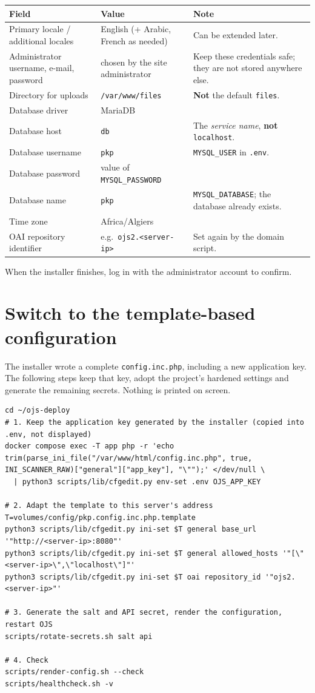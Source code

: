 \documentclass[11pt,a4paper]{report}
\newcommand{\code}[1]{\texttt{\small #1}}
\newcommand{\file}[1]{\texttt{\small #1}}
\begin{document}
\begin{tabularx}{\linewidth}{@{}P{4.8cm}P{4.2cm}L@{}}
\toprule
\textbf{Field} & \textbf{Value} & \textbf{Note} \\
\midrule
Primary locale / additional locales & English (+ Arabic, French as needed) & Can be extended later. \\
Administrator username, e-mail, password & chosen by the site administrator & Keep these credentials safe; they are not stored anywhere else. \\
Directory for uploads   & \code{/var/www/files}  & \textbf{Not} the default \code{files}. \\
Database driver         & MariaDB                & \\
Database host           & \code{db}              & The \emph{service name}, \textbf{not} \code{localhost}. \\
Database username       & \code{pkp}             & \code{MYSQL\_USER} in \file{.env}. \\
Database password       & value of \code{MYSQL\_PASSWORD} & \\
Database name           & \code{pkp}             & \code{MYSQL\_DATABASE}; the database already exists. \\
Time zone               & Africa/Algiers         & \\
OAI repository identifier & e.g.\ \code{ojs2.<server-ip>} & Set again by the domain script. \\
\bottomrule
\end{tabularx}

When the installer finishes, log in with the administrator account to confirm.

\section{Switch to the template-based configuration}\label{sec:aftersetup}
The installer wrote a complete \file{config.inc.php}, including a new application key. The
following steps keep that key, adopt the project's hardened settings and generate the
remaining secrets. Nothing is printed on screen.

\begin{lstlisting}
cd ~/ojs-deploy
# 1. Keep the application key generated by the installer (copied into .env, not displayed)
docker compose exec -T app php -r 'echo trim(parse_ini_file("/var/www/html/config.inc.php", true, INI_SCANNER_RAW)["general"]["app_key"], "\"");' </dev/null \
  | python3 scripts/lib/cfgedit.py env-set .env OJS_APP_KEY

# 2. Adapt the template to this server's address
T=volumes/config/pkp.config.inc.php.template
python3 scripts/lib/cfgedit.py ini-set $T general base_url '"http://<server-ip>:8080"'
python3 scripts/lib/cfgedit.py ini-set $T general allowed_hosts '"[\"<server-ip>\",\"localhost\"]"'
python3 scripts/lib/cfgedit.py ini-set $T oai repository_id '"ojs2.<server-ip>"'

# 3. Generate the salt and API secret, render the configuration, restart OJS
scripts/rotate-secrets.sh salt api

# 4. Check
scripts/render-config.sh --check
scripts/healthcheck.sh -v
\end{lstlisting}
\end{document}
